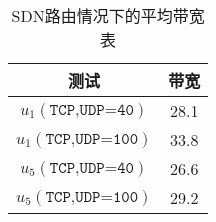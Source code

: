
\begin{table}[h]
  \centering
  \begin{tabular}{cc}
    \toprule
    测试 & 带宽 \\
    \midrule
    $ u_1(\texttt{TCP,UDP=40}) $ & 28.1 \\
    $ u_1(\texttt{TCP,UDP=100}) $ & 33.8 \\
    $ u_5(\texttt{TCP,UDP=40}) $ & 26.6 \\
    $ u_5(\texttt{TCP,UDP=100}) $ & 29.2 \\
    \bottomrule
  \end{tabular}
  \caption{SDN路由情况下的平均带宽表}
\end{table}